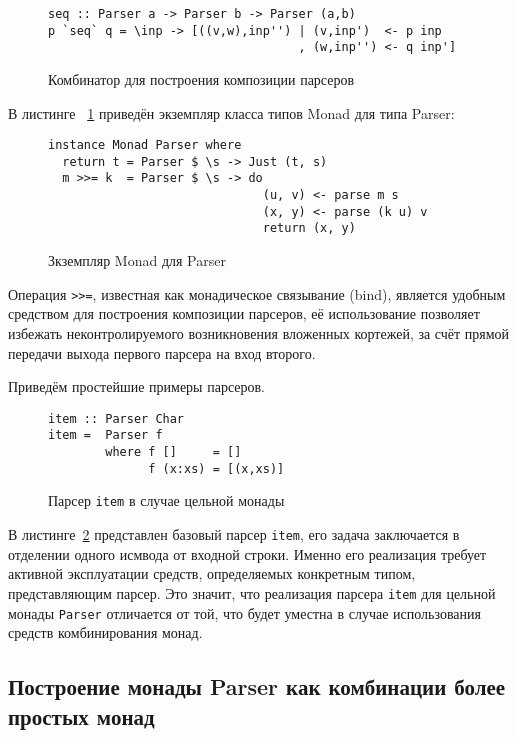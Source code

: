 \begin{figure}[h]
\begin{lstlisting}
seq :: Parser a -> Parser b -> Parser (a,b)
p `seq` q = \inp -> [((v,w),inp'') | (v,inp')  <- p inp
                                   , (w,inp'') <- q inp']
\end{lstlisting}
\caption{Комбинатор для построения композиции парсеров}
\end{figure}

В листинге ~\ref{listing:MonadParser} приведён экземпляр класса типов Monad для типа Parser: 

\begin{figure}[t]
  \begin{lstlisting}
instance Monad Parser where
  return t = Parser $ \s -> Just (t, s)
  m >>= k  = Parser $ \s -> do 
                              (u, v) <- parse m s
                              (x, y) <- parse (k u) v
                              return (x, y)
  \end{lstlisting}
  \caption{Зкземпляр Monad для Parser}
  \label{listing:MonadParser}
\end{figure}

Операция \lstinline{>>=}, известная как монадическое связывание (bind), является удобным средством для построения композиции парсеров, её использование позволяет избежать неконтролируемого возникновения вложенных кортежей, за счёт прямой передачи выхода первого парсера на вход второго. 

Приведём простейшие примеры парсеров. 

\begin{figure}[h]
  \begin{lstlisting}
item :: Parser Char
item =  Parser f 
        where f []     = []
              f (x:xs) = [(x,xs)]
  \end{lstlisting}
  \caption{Парсер \lstinline{item} в случае цельной монады}
  \label{listing:ParserItem}
\end{figure}

В листинге~\ref{listing:ParserItem} представлен базовый парсер \lstinline{item}, его задача заключается в отделении одного исмвода от входной строки. Именно его реализация требует активной эксплуатации средств, определяемых конкретным типом, представляющим парсер. Это значит, что реализация парсера \lstinline{item} для цельной монады \lstinline{Parser} отличается от той, что будет уместна в случае использования средств комбинирования монад.

\subsection{Построение монады Parser как комбинации более простых монад}

